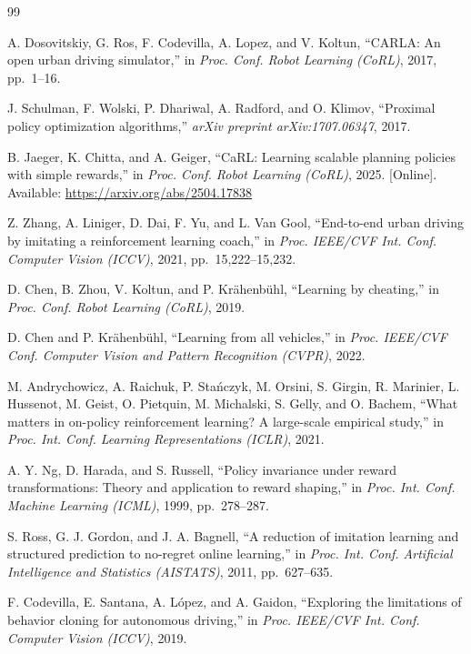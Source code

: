 \documentclass[conference]{IEEEtran}
\begin{document}
\begin{thebibliography}{99}

 A. Dosovitskiy, G. Ros, F. Codevilla, A. Lopez,
and V. Koltun, ``CARLA: An open urban driving simulator,'' in
\emph{Proc. Conf. Robot Learning (CoRL)}, 2017, pp.~1--16.

 J. Schulman, F. Wolski, P. Dhariwal, A. Radford,
and O. Klimov, ``Proximal policy optimization algorithms,''
\emph{arXiv preprint arXiv:1707.06347}, 2017.

 B. Jaeger, K. Chitta, and A. Geiger, ``CaRL:
Learning scalable planning policies with simple rewards,'' in
\emph{Proc. Conf. Robot Learning (CoRL)}, 2025. [Online].
Available: \url{https://arxiv.org/abs/2504.17838}

 Z. Zhang, A. Liniger, D. Dai, F. Yu, and L. Van
Gool, ``End-to-end urban driving by imitating a reinforcement
learning coach,'' in \emph{Proc. IEEE/CVF Int. Conf. Computer
Vision (ICCV)}, 2021, pp.~15{,}222--15{,}232.

 D. Chen, B. Zhou, V. Koltun, and P.
Kr\"ahenb\"uhl, ``Learning by cheating,'' in \emph{Proc. Conf.
Robot Learning (CoRL)}, 2019.

 D. Chen and P. Kr\"ahenb\"uhl, ``Learning from
all vehicles,'' in \emph{Proc. IEEE/CVF Conf. Computer Vision
and Pattern Recognition (CVPR)}, 2022.

 M. Andrychowicz, A. Raichuk, P.
Sta\'nczyk, M. Orsini, S. Girgin, R. Marinier, L. Hussenot,
M. Geist, O. Pietquin, M. Michalski, S. Gelly, and O. Bachem,
``What matters in on-policy reinforcement learning? A
large-scale empirical study,'' in \emph{Proc. Int. Conf.
Learning Representations (ICLR)}, 2021.

 A. Y. Ng, D. Harada, and S. Russell, ``Policy
invariance under reward transformations: Theory and application
to reward shaping,'' in \emph{Proc. Int. Conf. Machine Learning
(ICML)}, 1999, pp.~278--287.

 S. Ross, G. J. Gordon, and J. A. Bagnell,
``A reduction of imitation learning and structured prediction
to no-regret online learning,'' in \emph{Proc. Int. Conf.
Artificial Intelligence and Statistics (AISTATS)}, 2011,
pp.~627--635.

 F. Codevilla, E. Santana, A. L\'opez, and
A. Gaidon, ``Exploring the limitations of behavior cloning for
autonomous driving,'' in \emph{Proc. IEEE/CVF Int. Conf.
Computer Vision (ICCV)}, 2019.


\end{thebibliography}
\end{document}
